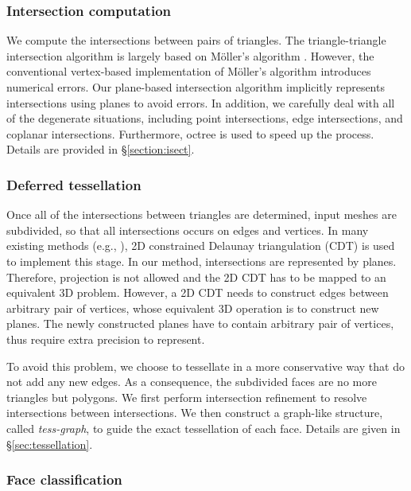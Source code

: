 \subsubsection{Intersection computation}

We compute the intersections between pairs of triangles. The triangle-triangle intersection algorithm is largely based on M\"{o}ller's algorithm \cite{moller1997fast}. However, the conventional vertex-based implementation of M\"{o}ller's algorithm introduces numerical errors. Our plane-based intersection algorithm implicitly represents intersections using planes to avoid errors. In addition, we carefully deal with all of the degenerate situations, including point intersections, edge intersections, and coplanar intersections. Furthermore, octree is used to speed up the process. Details are provided in \S\ref{section:isect}.

\subsubsection{Deferred tessellation}

Once all of the intersections between triangles are determined, input meshes are subdivided, so that all intersections occurs on edges and vertices. In many existing methods (e.g., \cite{ogayar2015deferred,zhou2016mesh}), 2D constrained Delaunay triangulation (CDT) \cite{chew1989constrained,de1992line} is used to implement this stage. In our method, intersections are represented by planes. Therefore, projection is not allowed and the 2D CDT has to be mapped to an equivalent 3D problem. However, a 2D CDT needs to construct edges between arbitrary pair of vertices, whose equivalent 3D operation is to construct new planes. The newly constructed planes have to contain arbitrary pair of vertices, thus require extra precision to represent.

To avoid this problem, we choose to tessellate in a more conservative way that do not add any new edges. As a consequence, the subdivided faces are no more triangles but polygons. We first perform intersection refinement to resolve intersections between intersections. We then construct a graph-like structure, called \emph{tess-graph}, to guide the exact tessellation of each face. Details are given in \S\ref{sec:tessellation}.

\subsubsection{Face classification}

